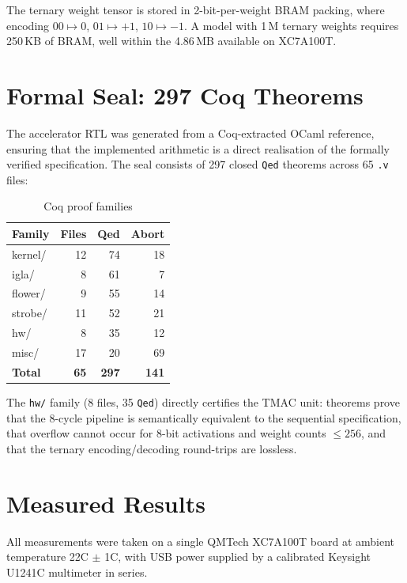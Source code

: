 The ternary weight tensor is stored in 2-bit-per-weight BRAM packing, where encoding $00 \mapsto 0$, $01 \mapsto +1$, $10 \mapsto -1$. A model with 1\,M ternary weights requires 250\,KB of BRAM, well within the 4.86\,MB available on XC7A100T.

\section{Formal Seal: 297 Coq Theorems}

The accelerator RTL was generated from a Coq-extracted OCaml reference, ensuring that the implemented arithmetic is a direct realisation of the formally verified specification. The seal consists of 297 closed \texttt{Qed} theorems across 65 \texttt{.v} files:

\begin{table}[h]
\centering
\caption{Coq proof families}
\label{tab:coq-families}
\begin{tabular}{lrrr}
\toprule
\textbf{Family} & \textbf{Files} & \textbf{Qed} & \textbf{Abort} \\
\midrule
kernel/  & 12 & 74  & 18 \\
igla/    & 8  & 61  & 7  \\
flower/  & 9  & 55  & 14 \\
strobe/  & 11 & 52  & 21 \\
hw/      & 8  & 35  & 12 \\
misc/    & 17 & 20  & 69 \\
\midrule
\textbf{Total} & \textbf{65} & \textbf{297} & \textbf{141} \\
\bottomrule
\end{tabular}
\end{table}

The \texttt{hw/} family (8 files, 35 \texttt{Qed}) directly certifies the TMAC unit: theorems prove that the 8-cycle pipeline is semantically equivalent to the sequential specification, that overflow cannot occur for 8-bit activations and weight counts $\leq 256$, and that the ternary encoding/decoding round-trips are lossless.

\section{Measured Results}

All measurements were taken on a single QMTech XC7A100T board at ambient temperature 22\textdegree{}C $\pm$ 1\textdegree{}C, with USB power supplied by a calibrated Keysight U1241C multimeter in series.

